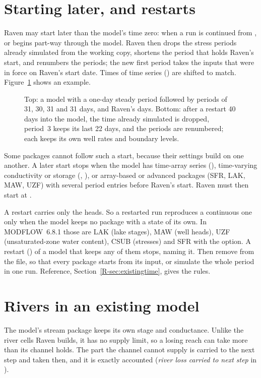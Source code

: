 \section{Starting later, and restarts}\label{sec:uextrestart}
Raven may start later than the model's time zero: when a run is continued from , or begins part-way
through the model. Raven then drops the stress periods already simulated from the working copy, shortens the period that
holds Raven's start, and renumbers the periods; the new first period takes the inputs that were in force on Raven's start
date. Times of time series () are shifted to match. Figure~\ref{fig:uperiods} shows an example.
\begin{figure}[!htbp]\centering
\caption{Top: a model with a one-day steady period followed by periods of 31, 30, 31 and 31 days, and Raven's days. Bottom: after a restart 40 days into the model, the time already simulated is dropped, period~3 keeps its last 22 days, and the periods are renumbered; each keeps its own well rates and boundary levels.}\label{fig:uperiods}
\end{figure}

Some packages cannot follow such a start, because their settings build on one another. A later start stops when the
model has time-array series (), time-varying conductivity or storage (, ), or array-based or
advanced packages (SFR, LAK, MAW, UZF) with several period entries before Raven's start. Raven must then start at
.

A restart carries only the heads. So a restarted run reproduces a continuous one only when the model keeps no package
with a state of its own. In MODFLOW~6.8.1 those are LAK (lake stages), MAW (well heads), UZF (unsaturated-zone water
content), CSUB (stresses) and SFR with the  option. A restart () of a model that keeps any of
them stops, naming it. Then remove  from the  file, so that every package starts from its input,
or simulate the whole period in one run. Reference, Section~\ref{R-sec:existingtime}, gives the rules.

\section{Rivers in an existing model}
The model's stream package keeps its own stage and conductance. Unlike the river cells Raven builds, it has no supply
limit, so a losing reach can take more than its channel holds. The part the channel cannot supply is carried to the next
step and taken then, and it is exactly accounted (\emph{river loss carried to next step} in ).

